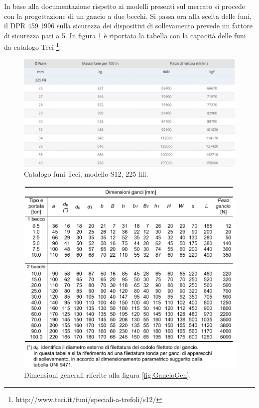 In base alla documentazione rispetto ai modelli presenti sul mercato si procede con la progettazione di un gancio a due becchi.
Si passa ora alla scelta delle funi, il DPR 459 1996 sulla sicurezza dei dispositivi di sollevamento prevede un fattore di sicurezza pari a 5. 
In figura \ref{fig:TabellaFuni} è riportata la tabella con la capacità delle funi da catalogo Teci \footnote{http://www.teci.it/funi/speciali-a-trefoli/s12/}. 
\begin{figure}[H]
\centering
  \includegraphics[width=.65\textwidth]{imgs/TabellaFuni}
\caption{Catalogo funi Teci, modello S12, 225 fili.}
\label{fig:TabellaFuni}
\end{figure}
\begin{figure}[H]
\centering
  \includegraphics[width=.65\textwidth]{imgs/DimGen0}
\caption{Dimensioni generali riferite alla figura \ref{fig:GancioGen}.}
\label{fig:DimGen0}
\end{figure}
